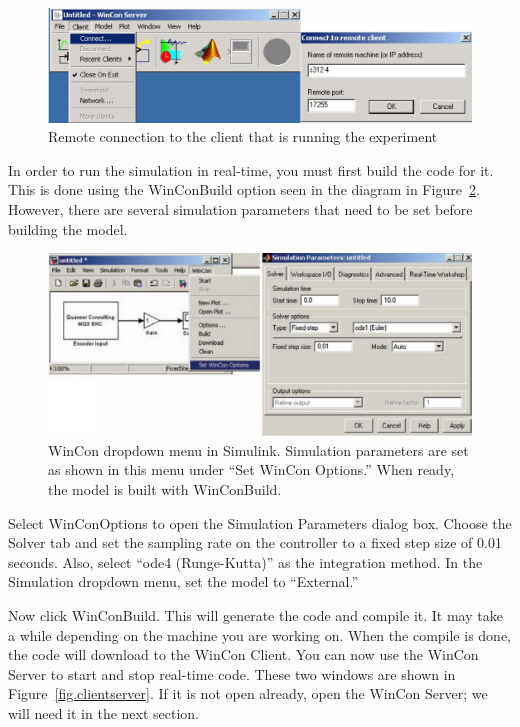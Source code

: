 \begin{figure}[bht]
\centering
\includegraphics[width=.6\textwidth]{clientconnect}
\caption{ \footnotesize
        Remote connection to the client that is running the experiment
        \label{fig.clientconnect}
        }
\end{figure}

In order to run the simulation in real-time, you must first build the code for it.  This is done using the WinCon\textrightarrow Build option seen in the diagram in Figure~\ref{fig.winconbuild}.  However, there are several simulation parameters that need to be set before building the model.

\begin{figure}[bht]
\centering
\includegraphics[width=.75\textwidth]{winconbuild}
\caption{ \footnotesize
        WinCon dropdown menu in Simulink.  Simulation parameters are set as shown in this menu under ``Set WinCon Options.''  When ready, the model is built with WinCon\textrightarrow Build.
        \label{fig.winconbuild}
        }
\end{figure}

Select WinCon\textrightarrow Options to open the Simulation Parameters dialog box.  Choose the Solver tab and set the sampling rate on the controller to a fixed step size of 0.01 seconds.  Also, select ``ode4 (Runge-Kutta)'' as the integration method.  In the Simulation dropdown menu, set the model to ``External.''
\par
Now click WinCon\textrightarrow Build.  This will generate the code and compile it.  It may take a while depending on the machine you are working on.  When the compile is done, the code will download to the WinCon Client.  You can now use the WinCon Server to start and stop real-time code.  These two windows are shown in Figure~\ref{fig.clientserver}.  If it is not open already, open the WinCon Server; we will need it in the next section.

